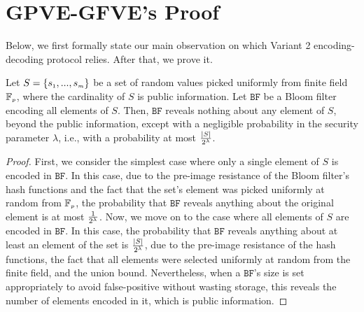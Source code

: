 

\vspace{-.5mm}
\section{GPVE-GFVE's Proof}\label{sec::Variant-2-Theorem-proof}
\vspace{-1mm}

Below, we first formally state our main observation on which Variant 2 encoding-decoding protocol relies. After that, we prove it.

\vspace{-1mm}
\begin{theorem}
Let  $S=\{s_{\scriptscriptstyle 1},..., s_{\scriptscriptstyle m}\}$ be a set of random values picked uniformly from finite field $\mathbb{F}_{\scriptscriptstyle p}$, where the cardinality of $S$ is public information. Let $\mathtt{BF}$ be a Bloom filter encoding all elements of   $S$. Then,  $\mathtt{BF}$ reveals nothing about any element of $S$, beyond the public information, except with a negligible probability in the security parameter $\lambda$, i.e., with a probability at most $\frac{|S|}{2^{\scriptscriptstyle \lambda}}$. 
\end{theorem}

\vspace{-4.5mm}
\begin{proof}
First, we consider the simplest case where only a single element of $S$ is encoded in $\mathtt{BF}$. In this case, due to the pre-image resistance of the Bloom filter's hash functions and the fact that the set's element was picked uniformly at random from $\mathbb{F}_{\scriptscriptstyle p}$, the probability that $\mathtt{BF}$ reveals anything about the original element is at most $\frac{1}{2^{\scriptscriptstyle \lambda}}$. Now, we move on to the case where all elements of $S$ are encoded in $\mathtt{BF}$. In this case, the probability that $\mathtt{BF}$ reveals anything about at least an element of the set is $\frac{|S|}{2^{\scriptscriptstyle \lambda}}$, due to the pre-image resistance of the hash functions,  the fact that all elements were selected uniformly at random from the finite field, and the union bound. Nevertheless, when a $\mathtt{BF}$'s size is set appropriately to avoid false-positive without wasting storage, this reveals the number of elements encoded in it, which is public information.  %
\end{proof}

